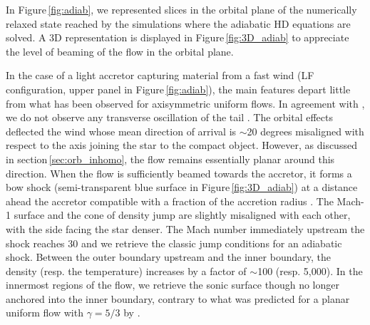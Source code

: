 \documentclass{aa}
\begin{document}
In Figure\,\ref{fig:adiab}, we represented slices in the orbital plane of the numerically relaxed state reached by the simulations where the adiabatic HD equations are solved. A 3D representation is displayed in Figure\,\ref{fig:3D_adiab} to appreciate the level of beaming of the flow in the orbital plane.

In the case of a light accretor capturing material from a fast wind (LF configuration, upper panel in Figure\,\ref{fig:adiab}), the main features depart little from what has been observed for axisymmetric uniform flows. In agreement with \cite{Blondin:2012vf}, we do not observe any transverse oscillation of the tail \citep[the so-called "flip-flop instability" which arises mostly in 2D polar numerical setups,][]{Foglizzo2005}. The orbital effects deflected the wind whose mean direction of arrival is $\sim$20 degrees misaligned with respect to the axis joining the star to the compact object. However, as discussed in section\,\ref{sec:orb_inhomo}, the flow remains essentially planar around this direction. When the flow is sufficiently beamed towards the accretor, it forms a bow shock (semi-transparent blue surface in Figure\,\ref{fig:3D_adiab}) at a distance ahead the accretor compatible with a fraction of the accretion radius \citep{Edgar:2004ip}. The Mach-1 surface and the cone of density jump are slightly misaligned with each other, with the side facing the star denser. The Mach number immediately upstream the shock reaches 30 and we retrieve the classic jump conditions for an adiabatic shock. Between the outer boundary upstream and the inner boundary, the density (resp. the temperature) increases by a factor of $\sim$100 (resp. 5,000). In the innermost regions of the flow, we retrieve the sonic surface though no longer anchored into the inner boundary, contrary to what was predicted for a planar uniform flow with $\gamma=5/3$ by \cite{Foglizzo1996}.
\end{document}
